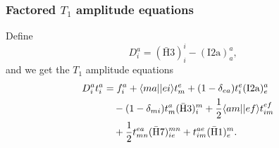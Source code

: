 \begin{frame}
    \frametitle{Factored $T_1$ amplitude equations}

    Define
\begin{equation*}
    D_i^a = (\mathrm{\bar{H}3})_i^i - (\mathrm{I2a})_a^a,
\end{equation*}
and we get the $T_1$ amplitude equations
\begin{align*}
    D_i^a t_i^a &= 
        f_{i}^a + \langle ma||ei\rangle t_m^e+ (1 - \delta_{ea}) t_i^e (\mathrm{I2a})_e^a & \\
    & \quad - (1 - \delta_{mi}) t_m^a (\mathrm{\bar{H}3})_i^m
        + \frac{1}{2} \langle am||ef\rangle t_{im}^{ef} \notag \\
    & \quad + \frac{1}{2} t_{mn}^{ea} (\mathrm{\bar{H}7})_{ie}^{mn} + t_{im}^{ae} (\mathrm{\bar{H}1})_e^m.
\end{align*}
\end{frame}



